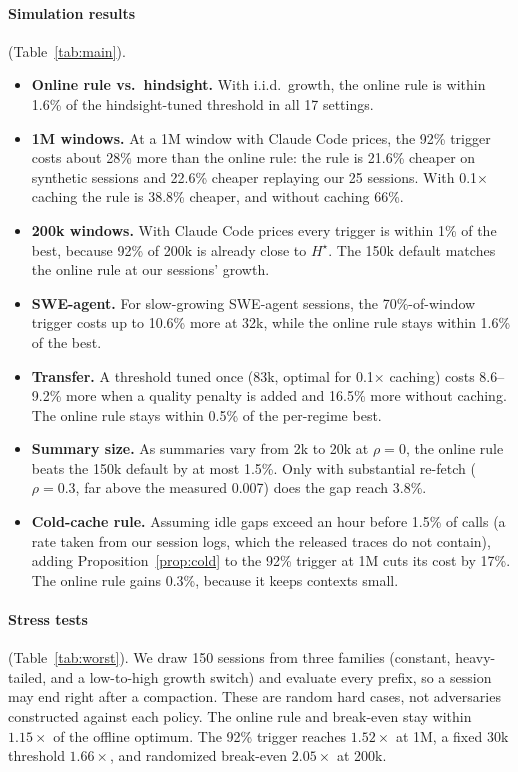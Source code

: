 \documentclass[11pt]{article}
\begin{document}
\paragraph{Simulation results} (Table~\ref{tab:main}).
\begin{itemize}
\item \textbf{Online rule vs.\ hindsight.} With i.i.d.\ growth, the online rule is within 1.6\% of the hindsight-tuned threshold in all 17 settings.
\item \textbf{1M windows.} At a 1M window with Claude Code prices, the 92\% trigger costs about 28\% more than the online rule: the rule is 21.6\% cheaper on synthetic sessions and 22.6\% cheaper replaying our 25 sessions. With 0.1$\times$ caching the rule is 38.8\% cheaper, and without caching 66\%.
\item \textbf{200k windows.} With Claude Code prices every trigger is within 1\% of the best, because 92\% of 200k is already close to $H^\star$. The 150k default matches the online rule at our sessions' growth.
\item \textbf{SWE-agent.} For slow-growing SWE-agent sessions, the 70\%-of-window trigger costs up to 10.6\% more at 32k, while the online rule stays within 1.6\% of the best.
\item \textbf{Transfer.} A threshold tuned once (83k, optimal for 0.1$\times$ caching) costs 8.6--9.2\% more when a quality penalty is added and 16.5\% more without caching. The online rule stays within 0.5\% of the per-regime best.
\item \textbf{Summary size.} As summaries vary from 2k to 20k at $\rho=0$, the online rule beats the 150k default by at most 1.5\%. Only with substantial re-fetch ($\rho=0.3$, far above the measured 0.007) does the gap reach 3.8\%.
\item \textbf{Cold-cache rule.} Assuming idle gaps exceed an hour before 1.5\% of calls (a rate taken from our session logs, which the released traces do not contain), adding Proposition~\ref{prop:cold} to the 92\% trigger at 1M cuts its cost by 17\%. The online rule gains 0.3\%, because it keeps contexts small.
\end{itemize}

\paragraph{Stress tests} (Table~\ref{tab:worst}). We draw 150 sessions from three families (constant, heavy-tailed, and a low-to-high growth switch) and evaluate every prefix, so a session may end right after a compaction. These are random hard cases, not adversaries constructed against each policy. The online rule and break-even stay within $1.15\times$ of the offline optimum. The 92\% trigger reaches $1.52\times$ at 1M, a fixed 30k threshold $1.66\times$, and randomized break-even $2.05\times$ at 200k.
\end{document}
